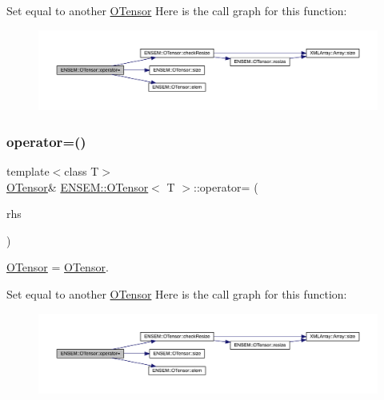 Set equal to another \mbox{\hyperlink{classENSEM_1_1OTensor}{O\+Tensor}} Here is the call graph for this function\+:
\nopagebreak
\begin{figure}[H]
\begin{center}
\leavevmode
\includegraphics[width=350pt]{da/d8a/classENSEM_1_1OTensor_a08690a1808269fccd113a9d634c7a73f_cgraph}
\end{center}
\end{figure}
\mbox{\label{classENSEM_1_1OTensor_a08690a1808269fccd113a9d634c7a73f}} 
\subsubsection{\texorpdfstring{operator=()}{operator=()}\hspace{0.1cm}{\footnotesize\ttfamily [8/12]}}
{\footnotesize\ttfamily template$<$class T$>$ \\
\mbox{\hyperlink{classENSEM_1_1OTensor}{O\+Tensor}}\& \mbox{\hyperlink{classENSEM_1_1OTensor}{E\+N\+S\+E\+M\+::\+O\+Tensor}}$<$ T $>$\+::operator= (\begin{DoxyParamCaption}\item[{const \mbox{\hyperlink{classENSEM_1_1OTensor}{O\+Tensor}}$<$ T $>$ \&}]{rhs }\end{DoxyParamCaption})\hspace{0.3cm}{\ttfamily [inline]}}



\mbox{\hyperlink{classENSEM_1_1OTensor}{O\+Tensor}} = \mbox{\hyperlink{classENSEM_1_1OTensor}{O\+Tensor}}. 

Set equal to another \mbox{\hyperlink{classENSEM_1_1OTensor}{O\+Tensor}} Here is the call graph for this function\+:
\nopagebreak
\begin{figure}[H]
\begin{center}
\leavevmode
\includegraphics[width=350pt]{da/d8a/classENSEM_1_1OTensor_a08690a1808269fccd113a9d634c7a73f_cgraph}
\end{center}
\end{figure}
\mbox{\label{classENSEM_1_1OTensor_a08690a1808269fccd113a9d634c7a73f}} 
